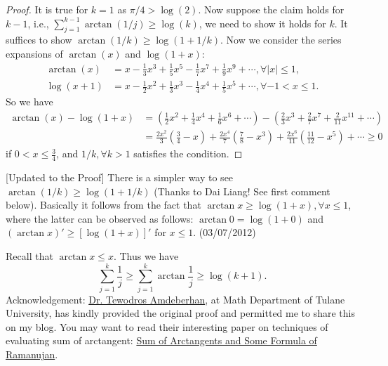 \documentclass[12pt]{article}
\begin{document}
\begin{proof}
It is true for $k=1$ as $\pi/4 > \log(2)$. Now suppose the claim holds for $k-1$, i.e., $\sum_{j=1}^{k-1} \arctan\left(1/j\right) \geq \log\left(k\right)$, we need to show it holds for $k$. It suffices to show $\arctan(1/k) \geq \log\left(1+1/k\right)$. Now we consider the series expansions of $\arctan\left(x\right)$ and $\log\left(1+x\right)$: 
\begin{eqnarray*}
\arctan\left(x\right) & = x - \frac{1}{3}x^3 + \frac{1}{5}x^5 - \frac{1}{7}x^7 + \frac{1}{9}x^9 + \cdots, \forall \left|x\right|\leq 1, \\
\log\left(x+1\right) & = x - \frac{1}{2}x^2 + \frac{1}{3}x^3 - \frac{1}{4}x^4 + \frac{1}{5}x^5 + \cdots, \forall -1 < x \leq 1. 
\end{eqnarray*}
So we have
\begin{eqnarray*}
\arctan\left(x\right) - \log\left(1+x\right) & = \left(\frac{1}{2}x^2 + \frac{1}{4}x^4 + \frac{1}{6}x^6 + \cdots\right) - \left(\frac{2}{3}x^3 + \frac{2}{7}x^7 + \frac{2}{11}x^{11} + \cdots \right) \\
& = \frac{2x^2}{3}\left(\frac{3}{4}- x\right) + \frac{2x^4}{7}\left(\frac{7}{8}-x^3\right) + \frac{2x^6}{11}\left(\frac{11}{12} - x^5\right) + \cdots \geq 0
\end{eqnarray*}
if $0< x \leq \frac{3}{4}$, and $1/k, \forall k>1$ satisfies the condition.
\end{proof}

[Updated to the Proof] There is a simpler way to see $\arctan \left(1/k\right) \geq \log\left(1+1/k\right)$ (Thanks to Dai Liang! See first comment below). Basically it follows from the fact that $\arctan x \geq \log \left(1+x\right), \forall x\leq 1$, where the latter can be observed as follows: $\arctan 0 = \log \left(1+0\right)$ and $\left(\arctan x\right)' \geq \left[\log \left(1+x\right)\right]'$ for $x \leq 1$. (03/07/2012)

Recall that $\arctan x \leq x$. Thus we have 
\begin{equation}
\boxed{\sum_{j=1}^{k} \frac{1}{j} \geq \sum_{j=1}^{k} \arctan \frac{1}{j} \geq \log \left(k+1\right)}.
\end{equation} 
Acknowledgement: \href{http://129.81.170.14/~tamdeberhan/}{Dr. Tewodros Amdeberhan}, at Math Department of Tulane University, has kindly provided the original proof and permitted me to share this on my blog. You may want to read their interesting paper on techniques of evaluating sum of arctangent: \href{http://129.81.170.14/~vhm/ac1.pdf}{Sum of Arctangents and Some Formula of Ramanujan}.  
\end{document}
